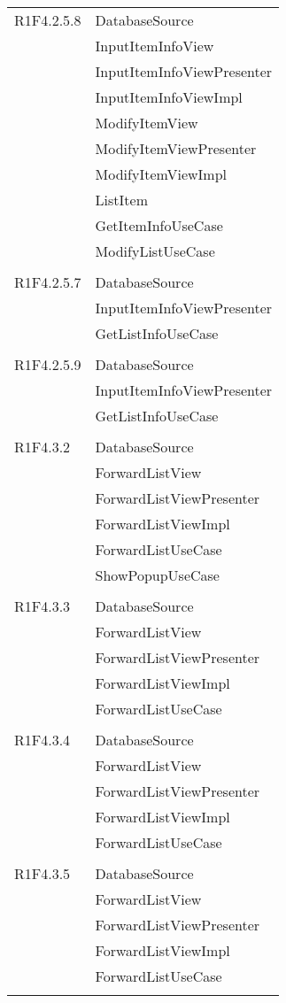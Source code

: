 \begin{center}
\begin{longtable}{|p{7cm}|p{7cm}|}
		R1F4.2.5.8 & DatabaseSource \\ & InputItemInfoView \\ & InputItemInfoViewPresenter \\ & InputItemInfoViewImpl \\ & ModifyItemView \\ & ModifyItemViewPresenter \\ & ModifyItemViewImpl \\ & ListItem \\ & GetItemInfoUseCase \\ & ModifyListUseCase \\ & \\ \hline
		R1F4.2.5.7 & DatabaseSource \\ & InputItemInfoViewPresenter \\ & GetListInfoUseCase \\ & \\ \hline
		R1F4.2.5.9 & DatabaseSource \\ & InputItemInfoViewPresenter \\ & GetListInfoUseCase \\ & \\ \hline
		R1F4.3.2 & DatabaseSource \\ & ForwardListView \\ & ForwardListViewPresenter \\ & ForwardListViewImpl \\ & ForwardListUseCase \\ & ShowPopupUseCase \\ & \\ \hline
		R1F4.3.3 & DatabaseSource \\ & ForwardListView \\ & ForwardListViewPresenter \\ & ForwardListViewImpl \\ & ForwardListUseCase \\ & \\ \hline
		R1F4.3.4 & DatabaseSource \\ & ForwardListView \\ & ForwardListViewPresenter \\ & ForwardListViewImpl \\ & ForwardListUseCase \\ & \\ \hline
		R1F4.3.5 & DatabaseSource \\ & ForwardListView \\ & ForwardListViewPresenter \\ & ForwardListViewImpl \\ & ForwardListUseCase \\ & \\ \hline

\end{longtable}
\end{center}

